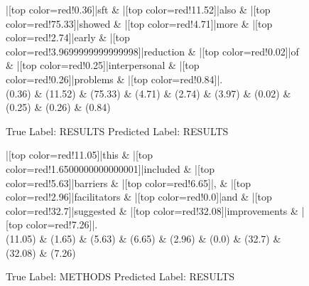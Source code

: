 \documentclass[a4paper, landscape]{article}
\begin{document}
\clearpage
\begin{figure}
\begin{center}
\begin{dependency}
\begin{deptext}
|[top color=red!0.36]|sft \& |[top color=red!11.52]|also \& |[top color=red!75.33]|showed \& |[top color=red!4.71]|more \& |[top color=red!2.74]|early \& |[top color=red!3.9699999999999998]|reduction \& |[top color=red!0.02]|of \& |[top color=red!0.25]|interpersonal \& |[top color=red!0.26]|problems \& |[top color=red!0.84]|.\\
(0.36) \& (11.52) \& (75.33) \& (4.71) \& (2.74) \& (3.97) \& (0.02) \& (0.25) \& (0.26) \& (0.84)\\
\end{deptext}
\end{dependency}
\end{center}
\caption{True Label: RESULTS Predicted Label: RESULTS}
\end{figure}
\clearpage
\begin{figure}
\begin{center}
\begin{dependency}
\begin{deptext}
|[top color=red!11.05]|this \& |[top color=red!1.6500000000000001]|included \& |[top color=red!5.63]|barriers \& |[top color=red!6.65]|, \& |[top color=red!2.96]|facilitators \& |[top color=red!0.0]|and \& |[top color=red!32.7]|suggested \& |[top color=red!32.08]|improvements \& |[top color=red!7.26]|.\\
(11.05) \& (1.65) \& (5.63) \& (6.65) \& (2.96) \& (0.0) \& (32.7) \& (32.08) \& (7.26)\\
\end{deptext}
\end{dependency}
\end{center}
\caption{True Label: METHODS Predicted Label: RESULTS}
\end{figure}
\clearpage
\end{document}
